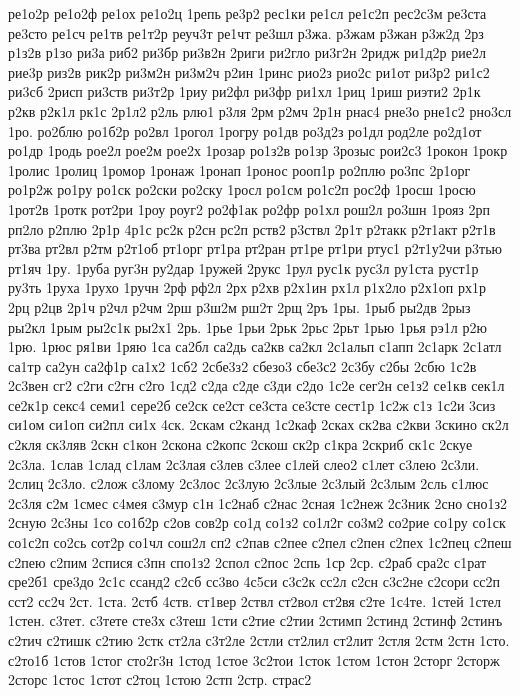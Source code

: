 ре1о2р
ре1о2ф
ре1ох
ре1о2ц
1репь
ре3р2
рес1ки
ре1сл
ре1с2п
рес2с3м
ре3ста
ре3сто
ре1сч
ре1тв
ре1т2р
реуч3т
ре1чт
ре3шл
р3жа.
р3жам
р3жан
р3ж2д
2рз
р1з2в
р1зо
ри3а
риб2
ри3бр
ри3в2н
2риги
ри2гло
ри3г2н
2ридж
ри1д2р
рие2л
рие3р
риз2в
рик2р
ри3м2н
ри3м2ч
р2ин
1ринс
рио2з
рио2с
ри1от
ри3р2
ри1с2
ри3сб
2рисп
ри3ств
ри3т2р
1риу
ри2фл
ри3фр
ри1хл
1риц
1риш
риэти2
2р1к
р2кв
р2к1л
рк1с
2р1л2
р2ль
рлю1
р3ля
2рм
р2мч
2р1н
рнас4
рне3о
рне1с2
рно3сл
1ро.
ро2блю
ро1б2р
ро2вл
1рогол
1рогру
ро1дв
ро3д2з
ро1дл
род2ле
ро2д1от
ро1др
1родь
рое2л
рое2м
рое2х
1розар
ро1з2в
ро1зр
3розыс
рои2с3
1рокон
1рокр
1ролис
1ролиц
1ромор
1ронаж
1ронап
1ронос
рооп1р
ро2плю
ро3пс
2р1орг
ро1р2ж
ро1ру
ро1ск
ро2ски
ро2ску
1росл
ро1см
ро1с2п
рос2ф
1росш
1росю
1рот2в
1ротк
рот2ри
1роу
роуг2
ро2ф1ак
ро2фр
ро1хл
рош2л
ро3шн
1рояз
2рп
рп2ло
р2плю
2р1р
4р1с
рс2к
р2сн
рс2п
рств2
р3ствл
2р1т
р2такк
р2т1акт
р2т1в
рт3ва
рт2вл
р2тм
р2т1об
рт1орг
рт1ра
рт2ран
рт1ре
рт1ри
ртус1
р2т1у2чи
р3тью
рт1яч
1ру.
1руба
руг3н
ру2дар
1ружей
2рукс
1рул
рус1к
рус3л
ру1ста
руст1р
ру3ть
1руха
1рухо
1ручн
2рф
рф2л
2рх
р2хв
р2х1ин
рх1л
р1х2ло
р2х1оп
рх1р
2рц
р2цв
2р1ч
р2чл
р2чм
2рш
р3ш2м
рш2т
2рщ
2ръ
1ры.
1рыб
ры2дв
2рыз
ры2кл
1рым
ры2с1к
ры2х1
2рь.
1рье
1рьи
2рьк
2рьс
2рьт
1рью
1рья
рэ1л
р2ю
1рю.
1рюс
ря1ви
1ряю
1са
са2бл
са2дь
са2кв
са2кл
2с1альп
с1апп
2с1арк
2с1атл
са1тр
са2ун
са2ф1р
са1х2
1сб2
2сбе3з2
сбезо3
сбе3с2
2с3бу
с2бы
2сбю
1с2в
2с3вен
сг2
с2ги
с2гн
с2го
1сд2
с2да
с2де
с3ди
с2до
1с2е
сег2н
се1з2
се1кв
сек1л
се2к1р
секс4
семи1
сере2б
се2ск
се2ст
се3ста
се3сте
сест1р
1с2ж
с1з
1с2и
3сиз
си1ом
си1оп
си2пл
си1х
4ск.
2скам
с2канд
1с2каф
2сках
ск2ва
с2кви
3скино
ск2л
с2кля
ск3ляв
2скн
с1кон
2скона
с2копс
2скош
ск2р
с1кра
2скриб
ск1с
2скуе
2с3ла.
1слав
1слад
с1лам
2с3лая
с3лев
с3лее
с1лей
слео2
с1лет
с3лею
2с3ли.
2слиц
2с3ло.
с2лож
с3лому
2с3лос
2с3лую
2с3лые
2с3лый
2с3лым
2сль
с1люс
2с3ля
с2м
1смес
с4мея
с3мур
с1н
1с2наб
с2нас
2сная
1с2неж
2с3ник
2сно
сно1з2
2сную
2с3ны
1со
со1б2р
с2ов
сов2р
со1д
со1з2
со1л2г
со3м2
со2рие
со1ру
со1ск
со1с2п
со2сь
сот2р
со1чл
сош2л
сп2
с2пав
с2пее
с2пел
с2пен
с2пех
1с2пец
с2пеш
с2пею
с2пим
2спися
с3пн
спо1з2
2спол
с2пос
2спь
1ср
2ср.
с2раб
сра2с
с1рат
сре2б1
сре3до
2с1с
ссанд2
с2сб
сс3во
4с5си
с3с2к
сс2л
с2сн
с3с2не
с2сори
сс2п
сст2
сс2ч
2ст.
1ста.
2стб
4ств.
ст1вер
2ствл
ст2вол
ст2вя
с2те
1с4те.
1стей
1стел
1стен.
с3тет.
с3тете
сте3х
с3теш
1сти
с2тие
с2тии
2стимп
2стинд
2стинф
2стинъ
с2тич
с2тишк
с2тию
2стк
ст2ла
с3т2ле
2стли
ст2лил
ст2лит
2стля
2стм
2стн
1сто.
с2то1б
1стов
1стог
сто2г3н
1стод
1стое
3с2тои
1сток
1стом
1стон
2сторг
2сторж
2сторс
1стос
1стот
с2тоц
1стою
2стп
2стр.
страс2
